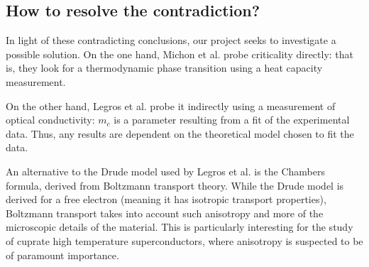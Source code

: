 \subsection{How to resolve the contradiction?}
In light of these contradicting conclusions, our project seeks to investigate a possible solution.
On the one hand, Michon et al.\cite{michon2019} probe criticality directly: 
that is, they look for a thermodynamic phase transition using a heat capacity measurement.

On the other hand, Legros et al.\cite{legros2022} probe it indirectly using a measurement of optical conductivity: 
$m_c$ is a parameter resulting from a fit of the experimental data. 
Thus, any results are dependent on the theoretical model chosen to fit the data.

An alternative to the Drude model used by Legros et al.\cite{legros2022} is the Chambers formula, 
derived from Boltzmann transport theory.  While the Drude model is derived for a
free electron (meaning it has isotropic transport properties), 
Boltzmann transport takes into account such anisotropy and more of the microscopic details of the
material.  This is particularly interesting for the study of cuprate high temperature
superconductors, where anisotropy is suspected to be of paramount importance.

